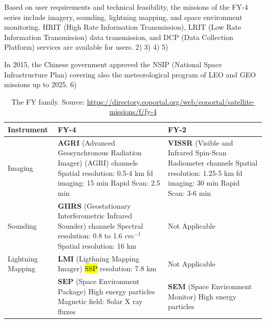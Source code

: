 \documentclass{article}
\begin{document}
Based on user requirements and technical feasibility, the missions of the FY-4 series include imagery, sounding, lightning mapping, and space environment monitoring. HRIT (High Rate Information Transmission), LRIT (Low Rate Information Transmission) data transmission, and DCP (Data Collection Platform) services are available for users. 2) 3) 4) 5)

In 2015, the Chinese government approved the NSIP (National Space Infrastructure Plan) covering also the meteorological program of LEO and GEO missions up to 2025. 6)


\begin{table}[h!]
\centering
\label{fig:fy4_vs_fy2}
\caption{The FY family. Source: \url{https://directory.eoportal.org/web/eoportal/satellite-missions/f/fy-4}}
\begin{tabulary}{\textwidth}{p{2cm}LL}
\toprule
Instrument & FY-4 & FY-2 \\ 
\midrule
Imaging &   \textbf{AGRI} (Advanced Geosynchronous Radiation Imager) (AGRI)  channels \newline
            Spatial resolution: 0.5-4 km \newline
            \ac{fd} imaging: 15 min \newline 
            Rapid Scan: 2.5 min 
        &   \textbf{VISSR} (Visible and Infrared Spin-Scan Radiometer channels \newline
            Spatial resolution: 1.25-5 km \newline
            \ac{fd} imaging: 30 min \newline
            Rapid Scan: 3-6 min \\
\midrule
Sounding & \textbf{GIIRS} (Geostationary Interferometric Infrared Sounder)  channels \newline
            Spectral resolution: 0.8 to 1.6 $cm^{-1}$ \newline
            Spatial resolution: 16 km 
        &  Not Applicable \\
\midrule
Lightning \newline 
Mapping &   \textbf{LMI} (Ligthning Mapping Imager) \newline   
            \hl{SSP} resolution: 7.8 km
        &  Not Applicable \\
\midrule
&   \textbf{SEP} (Space Environment Package) \newline
    High energy particles \newline
    Magnetic field: Solar X ray fluxes 
&   \textbf{SEM} (Space Environment Monitor) \newline
    High energy particles \\
\bottomrule
\end{tabulary}
\end{table}
\end{document}

